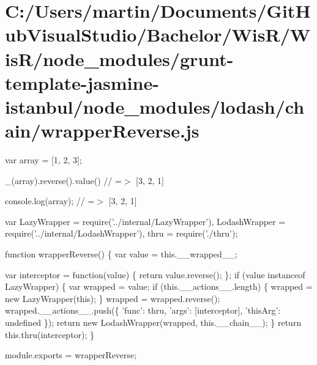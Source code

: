 \hypertarget{_c_1_2_users_2martin_2_documents_2_git_hub_visual_studio_2_bachelor_2_wis_r_2_wis_r_2node_module02a58a0f537a0e9688a7dc05b7bcd0cd}{}\section{C\+:/\+Users/martin/\+Documents/\+Git\+Hub\+Visual\+Studio/\+Bachelor/\+Wis\+R/\+Wis\+R/node\+\_\+modules/grunt-\/template-\/jasmine-\/istanbul/node\+\_\+modules/lodash/chain/wrapper\+Reverse.\+js}
var array = \mbox{[}1, 2, 3\mbox{]};

\+\_\+(array).reverse().value() // =$>$ \mbox{[}3, 2, 1\mbox{]}

console.\+log(array); // =$>$ \mbox{[}3, 2, 1\mbox{]}


\begin{DoxyCodeInclude}
var LazyWrapper = require(\textcolor{stringliteral}{'../internal/LazyWrapper'}),
    LodashWrapper = require(\textcolor{stringliteral}{'../internal/LodashWrapper'}),
    thru = require(\textcolor{stringliteral}{'./thru'});

\textcolor{keyword}{function} wrapperReverse() \{
  var value = this.\_\_wrapped\_\_;

  var interceptor = \textcolor{keyword}{function}(value) \{
    \textcolor{keywordflow}{return} value.reverse();
  \};
  \textcolor{keywordflow}{if} (value instanceof LazyWrapper) \{
    var wrapped = value;
    \textcolor{keywordflow}{if} (this.\_\_actions\_\_.length) \{
      wrapped = \textcolor{keyword}{new} LazyWrapper(\textcolor{keyword}{this});
    \}
    wrapped = wrapped.reverse();
    wrapped.\_\_actions\_\_.push(\{ \textcolor{stringliteral}{'func'}: thru, \textcolor{stringliteral}{'args'}: [interceptor], \textcolor{stringliteral}{'thisArg'}: undefined \});
    \textcolor{keywordflow}{return} \textcolor{keyword}{new} LodashWrapper(wrapped, this.\_\_chain\_\_);
  \}
  \textcolor{keywordflow}{return} this.thru(interceptor);
\}

module.exports = wrapperReverse;
\end{DoxyCodeInclude}
 